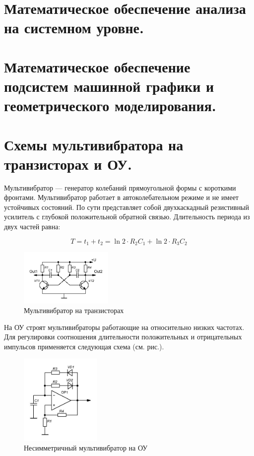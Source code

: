 \documentclass[unicode, 12pt, a4paper, oneside]{article}
\begin{document}
\section{Математическое обеспечение анализа на системном уровне.}
\section{Математическое обеспечение подсистем машинной графики и геометрического моделирования.}

\section{Схемы мультивибратора на транзисторах и ОУ.}

Мультивибратор — генератор колебаний прямоугольной формы с короткими фронтами. Мультивибратор работает в автоколебательном режиме и не имеет устойчивых состояний. По сути представляет собой двухкаскадный резистивный усилитель с глубокой положительной обратной связью. Длительность периода из двух частей равна:

\begin{displaymath}
T = t_1 + t_2 = \ln 2 \cdot R_2 C_1 + \ln 2 \cdot R_3 C_2
\end{displaymath}
\begin{figure}[H]
\centering
\includegraphics[width=0.4\textwidth]{141_tranz.jpg}
\caption{Мультивибратор на транзисторах}
\end{figure}
На ОУ строят мультивибраторы работающие на относительно низких частотах. Для регулировки соотношения длительности положительных и отрицательных импульсов применяется следующая схема (см. рис.).
\begin{figure}[H]
\centering
\includegraphics[width=0.35\textwidth]{141_OU_unsim.jpg}
\caption{Несимметричный мультивибратор на ОУ}
\end{figure}
\end{document}
